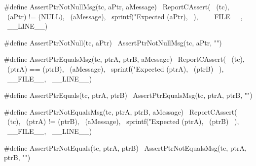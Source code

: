 \stopTestSuite

\startTestSuite[assertPtrNotNull]

\startCHeader
#define AssertPtrNotNullMsg(tc, aPtr, aMessage) \
  ReportCAssert(                                \
    (tc),                                       \
    (aPtr) != (NULL),                           \
    (aMessage),                                 \
    sprintf("Expected %
      (aPtr),                                   \
    ),                                          \
    __FILE__,                                   \
    __LINE__)

#define AssertPtrNotNull(tc, aPtr) \
  AssertPtrNotNullMsg(tc, aPtr, "")
\stopCHeader

\stopTestSuite

\startTestSuite[assertPtrEquals]

\startCHeader
#define AssertPtrEqualsMsg(tc, ptrA, ptrB, aMessage) \
  ReportCAssert(                                     \
    (tc),                                            \
    (ptrA) == (ptrB),                                \
    (aMessage),                                      \
    sprintf("Expected %
      (ptrA),                                        \
      (ptrB)                                         \
    ),                                               \
    __FILE__,                                        \
    __LINE__)

#define AssertPtrEquals(tc, ptrA, ptrB) \
  AssertPtrEqualsMsg(tc, ptrA, ptrB, "")
\stopCHeader

\stopTestSuite

\startTestSuite[assertPtrNotEquals]

\startCHeader
#define AssertPtrNotEqualsMsg(tc, ptrA, ptrB, aMessage) \
  ReportCAssert(                                        \
    (tc),                                               \
    (ptrA) != (ptrB),                                   \
    (aMessage),                                         \
    sprintf("Expected %
      (ptrA),                                           \
      (ptrB)                                            \
    ),                                                  \
    __FILE__,                                           \
    __LINE__)

#define AssertPtrNotEquals(tc, ptrA, ptrB) \
  AssertPtrNotEqualsMsg(tc, ptrA, ptrB, "")
\stopCHeader

\stopTestSuite


